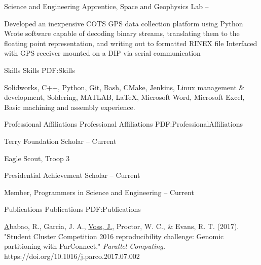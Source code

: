 \documentclass[letterpaper,MMMyyyy,nonstopmode]{simpleresumecv}
\newcommand{\CVNote}{Compiled on {\today}}
\begin{document}
\begin{Body}
\Gap
\BulletItem
Science and Engineering Apprentice, Space and Geophysics Lab
\hfill
{} --
\begin{Detail}
\SubBulletItem
Developed an inexpensive COTS GPS data collection platform using Python
\SubBulletItem
Wrote software capable of decoding binary streams, translating them to the floating point \newline
representation, and writing out to formatted RINEX file
\SubBulletItem
Interfaced with GPS receiver mounted on a DIP via serial communication
\end{Detail}



\Section
{Skills}
{Skills}
{PDF:Skills}

\Entry
Solidworks,
C++, 
Python, 
Git, 
Bash,
CMake,
Jenkins,
Linux management \& development, 
Soldering,
MATLAB,
\LaTeX,
Microsoft Word,
Microsoft Excel,
Basic machining and assembly experience.


\Section
{Professional Affiliations}
{Professional Affiliations}
{PDF:ProfessionalAffiliations}

\Entry
Terry Foundation Scholar
\hfill
{}--
Current

\Entry
Eagle Scout, Troop 3
\hfill
{}

\Entry
Presidential Achievement Scholar
\hfill
{}--
Current

\Entry
Member, Programmers in Science and Engineering
\hfill
{}--
Current



\Section
{Publications}
{Publications}
{PDF:Publications}

\Entry
\href{https://doi.org/10.1016/j.parco.2017.07.002}
Ababao, R., Garcia, J. A., \underline{Voss, J.}, Proctor, W. C., \& Evans, R. T. (2017). "Student Cluster Competition 2016 reproducibility challenge: Genomic partitioning with ParConnect." \textit{Parallel Computing.} https://doi.org/10.1016/j.parco.2017.07.002

\end{Body}


\end{document}
